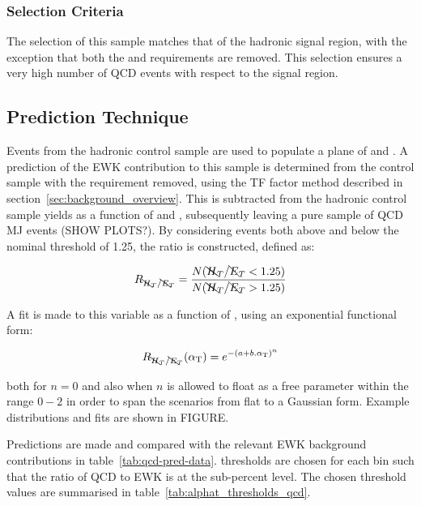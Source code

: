 \subsubsection{Selection Criteria}
The selection of this sample matches that of the hadronic signal region, with 
the exception that both the \alphat and \mhtmet requirements are removed. This 
selection ensures a very high number of QCD events with respect to the signal 
region.


\subsection{Prediction Technique}

Events from the hadronic control sample are used to populate a plane of \mhtmet 
and \alphat. A prediction of the EWK contribution to this sample is determined 
from the \mj control sample with the \mhtmet requirement removed, using the TF 
factor method described in section~\ref{sec:background_overview}. This is 
subtracted from the hadronic control sample yields as a function of \mhtmet and
\alphat, subsequently leaving a pure sample of QCD MJ events (SHOW PLOTS?).
By considering events both above and below the nominal \mhtmet threshold of
1.25, the ratio \rmhtmet is constructed, defined as:

\begin{equation}
\label{eq:rmhtmet}
R_{\bcancel{H}_T / \bcancel{E}_T} = \frac{N(\bcancel{H}_T / \bcancel{E}_T<1.25)}{N(\bcancel{H}_T / \bcancel{E}_T>1.25)}
\end{equation}

A fit is made to this variable as a function of \alphat, using an exponential 
functional form:

\begin{equation}
\label{eq:fit_exp}
R_{\bcancel{H}_T / \bcancel{E}_T}(\alpha_{\text{T}}) = e^{{-(a+b.\alpha_{\text{T}})}^n}
\end{equation}

both for $n=0$ and also when $n$ is allowed to float as a free 
parameter within the range $0-2$ in order to span the scenarios from flat to a
Gaussian form. Example distributions and fits are shown in FIGURE.

Predictions are made and compared with the relevant EWK background 
contributions in table~\ref{tab:qcd-pred-data}. \alphat thresholds are chosen 
for each \HT bin such that the ratio of QCD to EWK is at the sub-percent level. 
The chosen \alphat threshold values are summarised in
table~\ref{tab:alphat_thresholds_qcd}.

